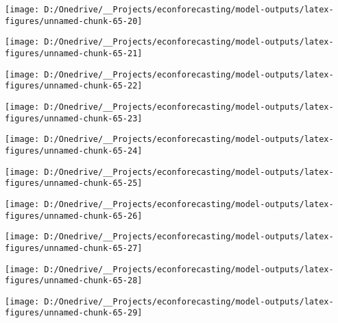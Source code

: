\documentclass[11pt, letterpaper]{article}\usepackage[]{graphicx}\usepackage[]{color}
\begin{document}
{\centering \texttt{[image: D:/Onedrive/\_\_Projects/econforecasting/model-outputs/latex-figures/unnamed-chunk-65-20]} 

}




{\centering \texttt{[image: D:/Onedrive/\_\_Projects/econforecasting/model-outputs/latex-figures/unnamed-chunk-65-21]} 

}




{\centering \texttt{[image: D:/Onedrive/\_\_Projects/econforecasting/model-outputs/latex-figures/unnamed-chunk-65-22]} 

}




{\centering \texttt{[image: D:/Onedrive/\_\_Projects/econforecasting/model-outputs/latex-figures/unnamed-chunk-65-23]} 

}




{\centering \texttt{[image: D:/Onedrive/\_\_Projects/econforecasting/model-outputs/latex-figures/unnamed-chunk-65-24]} 

}




{\centering \texttt{[image: D:/Onedrive/\_\_Projects/econforecasting/model-outputs/latex-figures/unnamed-chunk-65-25]} 

}




{\centering \texttt{[image: D:/Onedrive/\_\_Projects/econforecasting/model-outputs/latex-figures/unnamed-chunk-65-26]} 

}




{\centering \texttt{[image: D:/Onedrive/\_\_Projects/econforecasting/model-outputs/latex-figures/unnamed-chunk-65-27]} 

}




{\centering \texttt{[image: D:/Onedrive/\_\_Projects/econforecasting/model-outputs/latex-figures/unnamed-chunk-65-28]} 

}




{\centering \texttt{[image: D:/Onedrive/\_\_Projects/econforecasting/model-outputs/latex-figures/unnamed-chunk-65-29]} 

}
\end{document}
